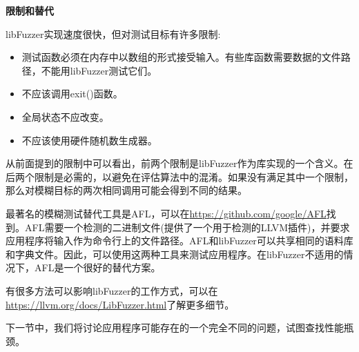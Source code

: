 \hspace*{\fill} \par %
\textbf{限制和替代}

libFuzzer实现速度很快，但对测试目标有许多限制:\par


\begin{itemize}
\item 测试函数必须在内存中以数组的形式接受输入。有些库函数需要数据的文件路径，不能用libFuzzer测试它们。

\item 不应该调用exit()函数。

\item 全局状态不应改变。

\item 不应该使用硬件随机数生成器。
\end{itemize}

从前面提到的限制中可以看出，前两个限制是libFuzzer作为库实现的一个含义。在后两个限制是必需的，以避免在评估算法中的混淆。如果没有满足其中一个限制，那么对模糊目标的两次相同调用可能会得到不同的结果。\par

最著名的模糊测试替代工具是AFL，可以在\url{https://github.com/google/AFL}找到。AFL需要一个检测的二进制文件(提供了一个用于检测的LLVM插件)，并要求应用程序将输入作为命令行上的文件路径。AFL和libFuzzer可以共享相同的语料库和字典文件。因此，可以使用这两种工具来测试应用程序。在libFuzzer不适用的情况下，AFL是一个很好的替代方案。\par

有很多方法可以影响libFuzzer的工作方式，可以在\url{https://llvm.org/docs/LibFuzzer.html}了解更多细节。\par

下一节中，我们将讨论应用程序可能存在的一个完全不同的问题，试图查找性能瓶颈。\par















































